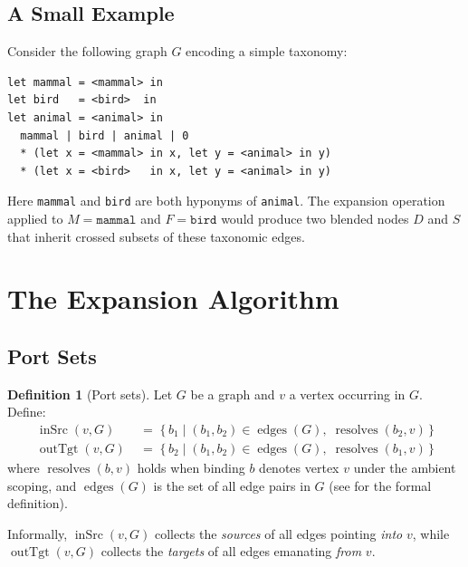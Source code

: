 \documentclass[11pt, a4paper]{article}
\theoremstyle{definition}
\newtheorem{definition}{Definition}[section]
\theoremstyle{plain}
\theoremstyle{remark}
\newcommand{\edges}{\operatorname{edges}}
\newcommand{\inSrc}{\operatorname{inSrc}}
\newcommand{\outTgt}{\operatorname{outTgt}}
\newcommand{\resolves}{\operatorname{resolves}}
\begin{document}
\subsection{A Small Example}

Consider the following graph $G$ encoding a simple taxonomy:

\begin{lstlisting}[style=dsl, caption={A small graph in DSL syntax}]
let mammal = <mammal> in
let bird   = <bird>  in
let animal = <animal> in
  mammal | bird | animal | 0
  * (let x = <mammal> in x, let y = <animal> in y)
  * (let x = <bird>   in x, let y = <animal> in y)
\end{lstlisting}

Here \lstinline[style=dsl]{mammal} and \lstinline[style=dsl]{bird} are both
hyponyms of \lstinline[style=dsl]{animal}.  The expansion operation applied to
$M = \texttt{mammal}$ and $F = \texttt{bird}$ would produce two blended nodes
$D$ and $S$ that inherit crossed subsets of these taxonomic edges.

\section{The Expansion Algorithm}
\label{sec:algorithm}

\subsection{Port Sets}

\begin{definition}[Port sets]
\label{def:ports}
Let $G$ be a graph and $v$ a vertex occurring in $G$.  Define:
\begin{align*}
  \inSrc(v, G)  &\;=\; \{\, b_1 \mid (b_1, b_2) \in \edges(G),\;
                           \resolves(b_2, v) \,\}\\
  \outTgt(v, G) &\;=\; \{\, b_2 \mid (b_1, b_2) \in \edges(G),\;
                           \resolves(b_1, v) \,\}
\end{align*}
where $\resolves(b, v)$ holds when binding $b$ denotes vertex $v$ under the
ambient scoping, and $\edges(G)$ is the set of all edge pairs in $G$
(see  for the formal definition).
\end{definition}

Informally, $\inSrc(v, G)$ collects the \emph{sources} of all edges pointing
\emph{into} $v$, while $\outTgt(v, G)$ collects the \emph{targets} of all
edges emanating \emph{from} $v$.
\end{document}
